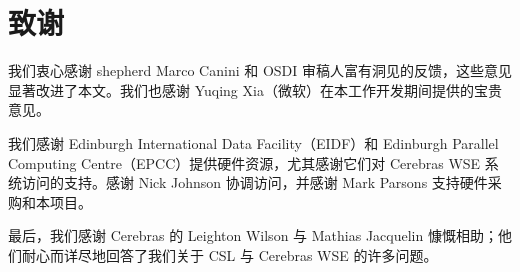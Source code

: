 \vspace{-0.3cm}
\section{致谢}

我们衷心感谢 shepherd Marco Canini 和 OSDI 审稿人富有洞见的反馈，这些意见显著改进了本文。我们也感谢 Yuqing Xia（微软）在本工作开发期间提供的宝贵意见。

我们感谢 Edinburgh International Data Facility（EIDF）和 Edinburgh Parallel Computing Centre（EPCC）提供硬件资源，尤其感谢它们对 Cerebras WSE 系统访问的支持。感谢 Nick Johnson 协调访问，并感谢 Mark Parsons 支持硬件采购和本项目。

最后，我们感谢 Cerebras 的 Leighton Wilson 与 Mathias Jacquelin 慷慨相助；他们耐心而详尽地回答了我们关于 CSL 与 Cerebras WSE 的许多问题。
